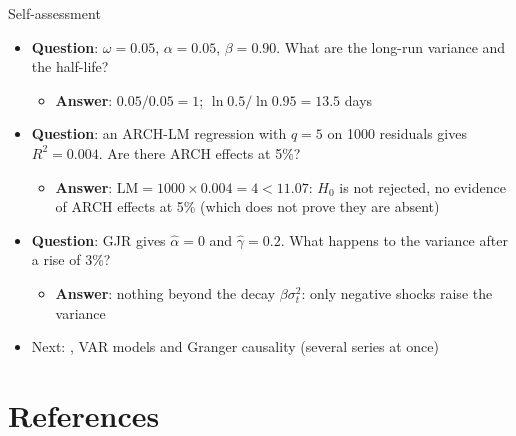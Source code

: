 \begin{frame}{Self-assessment}
\itemsize{\small}
\begin{itemize}
    \item \textbf{Question}: $\omega = 0.05$, $\alpha = 0.05$, $\beta = 0.90$. What are the long-run variance and the half-life?
    \begin{itemize}
        \item \textbf{Answer}: $0.05/0.05 = 1$; $\ln 0.5/\ln 0.95 = 13.5$ days
    \end{itemize}
    \item \textbf{Question}: an ARCH-LM regression with $q = 5$ on 1000 residuals gives $R^2 = 0.004$. Are there ARCH effects at 5\%?
    \begin{itemize}
        \item \textbf{Answer}: $\mathrm{LM} = 1000 \times 0.004 = 4 < 11.07$: $H_0$ is not rejected, no evidence of ARCH effects at 5\% (which does not prove they are absent)
    \end{itemize}
    \item \textbf{Question}: GJR gives $\hat\alpha = 0$ and $\hat\gamma = 0.2$. What happens to the variance after a rise of 3\%?
    \begin{itemize}
        \item \textbf{Answer}: nothing beyond the decay $\beta\sigma_t^2$: only negative shocks raise the variance
    \end{itemize}
    \item Next: , VAR models and Granger causality (several series at once)
\end{itemize}
\end{frame}


\section{References}

